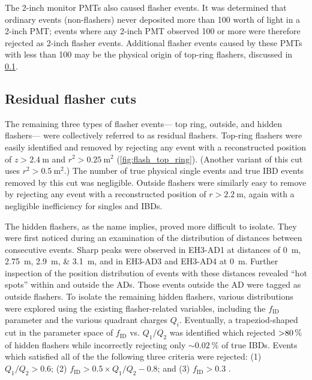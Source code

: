 The 2-inch monitor PMTs also caused flasher events.
It was determined that ordinary events (non-flashers)
never deposited more than \SI{100}{\pe} worth of light
in a 2-inch PMT;
events where any 2-inch PMT observed \SI{100}{\pe} or more
were therefore rejected as 2-inch flasher events.
Additional flasher events caused by these PMTs with less than \SI{100}{\pe}
may be the physical origin of top-ring flashers,
discussed in \cref{subsec:flash_resid}.

\subsection{Residual flasher cuts}
\label{subsec:flash_resid}

The remaining three types of flasher events---%
top ring, outside, and hidden flashers---%
were collectively referred to as residual flashers.
Top-ring flashers were easily identified and removed
by rejecting any event with a reconstructed position
of $z > \SI{2.4}{\m}$ and $r^2 > \SI{0.25}{\m\squared}$
(\cref{fig:flash_top_ring}).
(Another variant of this cut uses $r^2 > \SI{0.5}{\m\squared}$.)
The number of true physical single events and
true IBD events removed by this cut was negligible.
Outside flashers were similarly easy to remove
by rejecting any event with a reconstructed position
of $r > \SI{2.2}{\m}$,
again with a negligible inefficiency for singles and IBDs.

The hidden flashers, as the name implies, proved more difficult to isolate.
They were first noticed during an examination of the distribution of distances
between consecutive events.
Sharp peaks were observed in EH3-AD1 at distances of \SIlist{0;2.75;2.9;3.1}{\m},
and in EH3-AD3 and EH3-AD4 at \SI{0}{\m}.
Further inspection of the position distribution of events with these distances
revealed ``hot spots'' within and outside the ADs.
Those events outside the AD were tagged as outside flashers.
To isolate the remaining hidden flashers,
various distributions were explored using the existing flasher-related variables,
including the $f_{\text{ID}}$ parameter and the various quadrant charges $Q_i$.
Eventually, a trapeziod-shaped cut in the parameter space of
$f_{\text{ID}}$ vs. $Q_1/Q_2$ was identified which rejected
$\SI{>80}{\percent}$ of hidden flashers while incorrectly rejecting only
$\sim\SI{0.02}{\percent}$ of true IBDs.
Events which satisfied all of the the following three criteria were rejected:
(1) $Q_1/Q_2 > 0.6$; (2) $f_{\text{ID}} > 0.5 \times Q_1/Q_2 - 0.8$;
and (3) $f_{\text{ID}} > 0.3$ \cite{flashers_jinjing,beda_resid_flasher_dt}.


